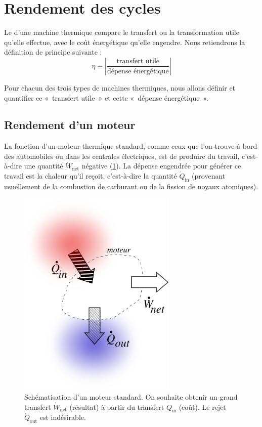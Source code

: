 \section{Rendement des cycles}

		Le  d’une machine thermique compare le transfert ou la transformation utile qu’elle effectue, avec le coût énergétique qu’elle engendre. Nous retiendrons la définition de principe suivante :
		\begin{equation}
			\eta  \equiv  \left| \frac{\text{transfert utile}}{\text{dépense énergétique}} \right|
			\label{def_efficacité_machines_thermiques}
		\end{equation}

		Pour chacun des trois types de machines thermiques, nous allons définir et quantifier ce «~transfert utile~» et cette «~dépense énergétique~».



		\subsection{Rendement d’un moteur}
		\label{ch_rendement_moteur}

			La fonction d’un moteur thermique standard, comme ceux que l’on trouve à bord des automobiles ou dans les centrales électriques, est de produire du travail, c’est-à-dire une quantité $\dot{W}_\text{net}$ négative (\cref{fig_transferts_moteur}). La dépense engendrée pour générer ce travail est la chaleur qu’il reçoit, c’est-à-dire la quantité $\dot{Q}_\text{in}$ (provenant usuellement de la combustion de carburant ou de la fission de noyaux atomiques).

			\begin{figure}
				\begin{center}
					\includegraphics[height=10cm]{images/eff_moteur.png}
				\end{center}
				\caption{Schématisation d’un moteur standard.
			On souhaite obtenir un grand transfert $\dot{W}_\text{net}$  (résultat) à partir du transfert $\dot{Q}_\text{in}$ (coût). 
			Le rejet $\dot{Q}_\text{out}$ est indésirable.}
				\label{fig_transferts_moteur}
			\end{figure}

